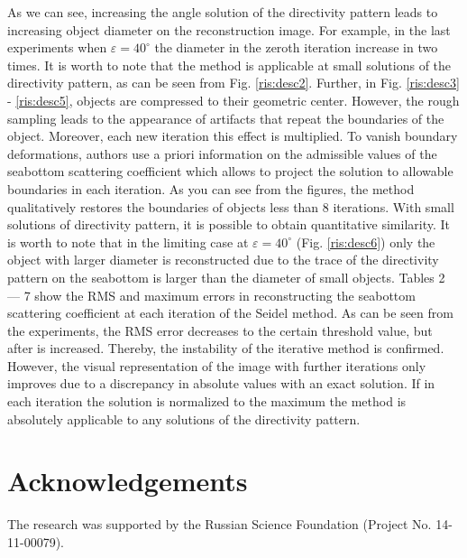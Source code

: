\documentclass{procDDs}
\begin{document}
As we can see, increasing the angle solution of the directivity pattern leads to increasing object diameter on the reconstruction image. For example, in the last experiments when $\varepsilon=40^\circ$ the diameter in the zeroth iteration increase in two times. It is worth to note that the method is applicable at small solutions of the directivity pattern, as can be seen from Fig. \ref{ris:desc2}. Further, in Fig. \ref{ris:desc3} - \ref{ris:desc5}, objects are compressed to their geometric center. However, the rough sampling leads to the appearance of artifacts that repeat the boundaries of the object. Moreover, each new iteration this effect is multiplied. To vanish boundary deformations, authors use a priori information on the admissible values of the seabottom scattering coefficient which allows to project the solution to allowable boundaries in each iteration. As you can see from the figures, the method qualitatively restores the boundaries of objects less than 8 iterations. With small solutions of directivity pattern, it is possible to obtain quantitative similarity. It is worth to note that in the limiting case at $\varepsilon = 40^\circ$ (Fig. \ref{ris:desc6}) only the object with larger diameter is reconstructed due to the trace of the directivity pattern on the seabottom is larger than the diameter of small objects. Tables 2 --- 7 show the RMS and maximum errors in reconstructing the seabottom scattering coefficient at each iteration of the Seidel method. As can be seen from the experiments, the RMS error decreases to the certain threshold value, but after is increased. Thereby, the instability of the iterative method is confirmed. However, the visual representation of the image with further iterations only improves due to a discrepancy in absolute values with an exact solution. If in each iteration the solution is normalized to the maximum the method is absolutely applicable to any solutions of the directivity pattern.

\section*{Acknowledgements}
The research was supported by the Russian Science Foundation (Project No. 14-11-00079).

\end{document}
